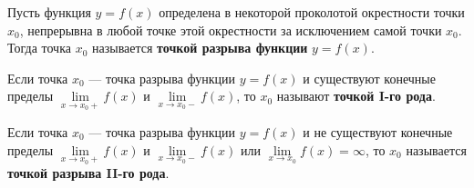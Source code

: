 \begin{definition}
  Пусть функция $y = f(x)$ определена в некоторой проколотой окрестности точки $x_0$, непрерывна в любой точке этой окрестности за исключением самой точки $x_0$.
  Тогда точка $x_0$ называется \textbf{точкой разрыва функции} $y = f(x)$.
\end{definition}
\begin{figure}[h]
\end{figure}
\vspace{-\topsep}
\begin{definition}
  Если точка $x_0$ --- точка разрыва функции $y = f(x)$ и существуют конечные пределы $\lim\limits_{x \to x_0+} f(x)$ и $\lim\limits_{x \to x_0-} f(x)$, то $x_0$ называют \textbf{точкой I-го рода}.
\end{definition}

\begin{definition}
  Если точка $x_0$ --- точка разрыва функции $y = f(x)$ и не существуют конечные пределы $\lim\limits_{x \to x_0+} f(x)$ и $\lim\limits_{x \to x_0-} f(x)$ или $\lim\limits_{x \to x_0} f(x) = \infty$, то $x_0$ называется \textbf{точкой разрыва II-го рода}.
\end{definition}

